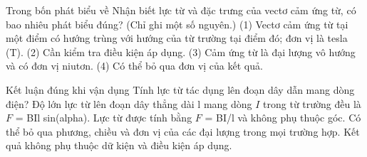\begin{ex}
Trong bốn phát biểu về Nhận biết lực từ và đặc trưng của vectơ cảm ứng từ, có bao nhiêu phát biểu đúng? (Chỉ ghi một số nguyên.) (1) Vectơ cảm ứng từ tại một điểm có hướng trùng với hướng của từ trường tại điểm đó; đơn vị là tesla (T). (2) Cần kiểm tra điều kiện áp dụng. (3) Cảm ứng từ là đại lượng vô hướng và có đơn vị niutơn. (4) Có thể bỏ qua đơn vị của kết quả.
\end{ex}

\begin{ex}
Kết luận đúng khi vận dụng Tính lực từ tác dụng lên đoạn dây dẫn mang dòng điện?
\choice
{\True Độ lớn lực từ lên đoạn dây thẳng dài l mang dòng $I$ trong từ trường đều là $F$ = BIl sin(alpha).}
{Lực từ được tính bằng $F$ = BI/l và không phụ thuộc góc.}
{Có thể bỏ qua phương, chiều và đơn vị của các đại lượng trong mọi trường hợp.}
{Kết quả không phụ thuộc dữ kiện và điều kiện áp dụng.}
\end{ex}

